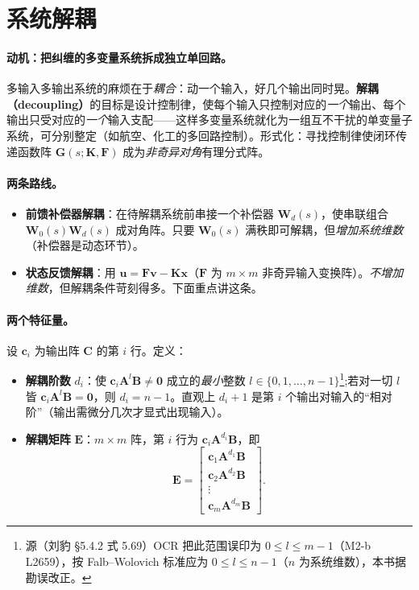 \section{系统解耦}
\label{sec:syn-decoupling}

\paragraph{动机：把纠缠的多变量系统拆成独立单回路。}
多输入多输出系统的麻烦在于\emph{耦合}：动一个输入，好几个输出同时晃。\textbf{解耦（decoupling）}的目标是设计控制律，使每个输入只控制对应的\emph{一个}输出、每个输出只受对应的\emph{一个}输入支配——这样多变量系统就化为一组互不干扰的单变量子系统，可分别整定（如航空、化工的多回路控制）。形式化：寻找控制律使闭环传递函数阵 $\mathbf G(s;\mathbf K,\mathbf F)$ 成为\emph{非奇异对角}有理分式阵。

\paragraph{两条路线。}
\begin{itemize}
  \item \textbf{前馈补偿器解耦}：在待解耦系统前串接一个补偿器 $\mathbf W_d(s)$，使串联组合 $\mathbf W_0(s)\mathbf W_d(s)$ 成对角阵。只要 $\mathbf W_0(s)$ 满秩即可解耦，但\emph{增加系统维数}（补偿器是动态环节）。
  \item \textbf{状态反馈解耦}：用 $\mathbf u=\mathbf F\mathbf v-\mathbf K\mathbf x$（$\mathbf F$ 为 $m\times m$ 非奇异输入变换阵）。\emph{不增加维数}，但解耦条件苛刻得多。下面重点讲这条。
\end{itemize}

\paragraph{两个特征量。}
设 $\mathbf c_i$ 为输出阵 $\mathbf C$ 的第 $i$ 行。定义\cite{liubao2006modern,zhang2017modern}：
\begin{itemize}
  \item \textbf{解耦阶数} $d_i$：使 $\mathbf c_i\mathbf A^l\mathbf B\neq\mathbf 0$ 成立的\emph{最小}整数 $l\in\{0,1,\dots,n-1\}$\footnote{源（刘豹 §5.4.2 式 5.69）OCR 把此范围误印为 $0\le l\le m-1$（M2-b L2659），按 Falb--Wolovich 标准应为 $0\le l\le n-1$（$n$ 为系统维数），本书据勘误改正。};若对一切 $l$ 皆 $\mathbf c_i\mathbf A^l\mathbf B=\mathbf 0$，则 $d_i=n-1$。直观上 $d_i+1$ 是第 $i$ 个输出对输入的“相对阶”（输出需微分几次才显式出现输入）。
  \item \textbf{解耦矩阵} $\mathbf E$：$m\times m$ 阵，第 $i$ 行为 $\mathbf c_i\mathbf A^{d_i}\mathbf B$，即
  \begin{equation}
    \mathbf E=\begin{bmatrix}\mathbf c_1\mathbf A^{d_1}\mathbf B\\\mathbf c_2\mathbf A^{d_2}\mathbf B\\\vdots\\\mathbf c_m\mathbf A^{d_m}\mathbf B\end{bmatrix}.
    \label{eq:syn-E}
  \end{equation}
\end{itemize}

